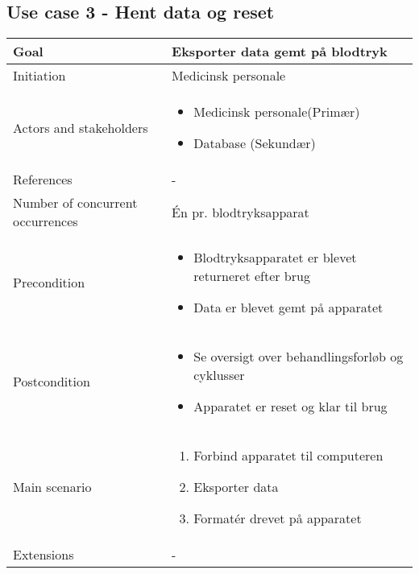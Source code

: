	\subsection{Use case 3 - Hent data og reset}
		\begin{center}
			\begin{tabular}{ | m{4cm} | m{8cm}| } 
				\hline
				Goal& Eksporter data gemt på blodtryk\\ 
				\hline
				Initiation &  Medicinsk personale\\
				\hline
				Actors and stakeholders & 
				\begin{itemize}
					\item Medicinsk personale(Primær)
					\item Database (Sekundær)
				\end{itemize} \\ 
				\hline
				References & - \\ 
				\hline
				Number of concurrent occurrences & Én pr. blodtryksapparat\\ 
				\hline	
				Precondition & 
				\begin{itemize}
					\item Blodtryksapparatet er blevet returneret efter brug
					\item Data er blevet gemt på apparatet
				\end{itemize} \\ 
				\hline
				Postcondition & 
				\begin{itemize}
					\item Se oversigt over behandlingsforløb og cyklusser 
					\item Apparatet er reset og klar til brug
				\end{itemize} \\ 
				\hline
				Main scenario & \begin{enumerate}
					\item Forbind apparatet til computeren
					\item Eksporter data
					\item Formatér drevet på apparatet 
				\end{enumerate} \\ 
				\hline
				Extensions & -\\ 
				\hline
			\end{tabular}
		\end{center}